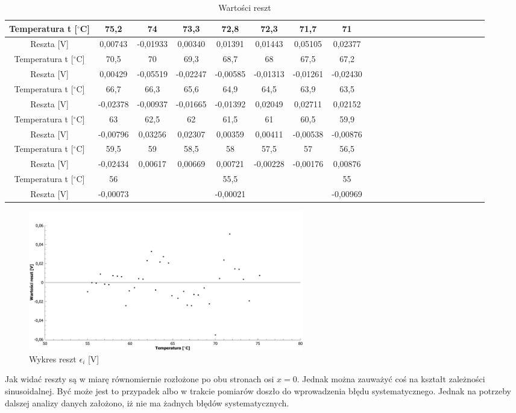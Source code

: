 \documentclass[10pt,a4paper]{article}
\begin{document}
\begin{center}
 \begin{table}[h!]
 \centering
 \caption{Wartości reszt}
 \begin{tabular}{|c|c|c|c|c|c|c|c|c|c|c|c|c|c|c|c|c|c|c|c|c|c|}
\hline
 Temperatura t [$^{\circ}$C]&75,2     & 74       & 73,3     & 72,8     & 72,3     & 71,7     & 71       \\ \hline
Reszta [V]&0,00743  & -0,01933 & 0,00340  & 0,01391  & 0,01443  & 0,05105  & 0,02377  \\ \hline
Temperatura t [$^{\circ}$C]&70,5     & 70       & 69,3     & 68,7     & 68       & 67,5     & 67,2     \\ \hline
Reszta [V]&0,00429  & -0,05519 & -0,02247 & -0,00585 & -0,01313 & -0,01261 & -0,02430 \\ \hline
Temperatura t [$^{\circ}$C]&66,7     & 66,3     & 65,6     & 64,9     & 64,5     & 63,9     & 63,5     \\ \hline
Reszta [V]&-0,02378 & -0,00937 & -0,01665 & -0,01392 & 0,02049  & 0,02711  & 0,02152  \\ \hline
Temperatura t [$^{\circ}$C]&63       & 62,5     & 62       & 61,5     & 61       & 60,5     & 59,9     \\ \hline
Reszta [V]&-0,00796 & 0,03256  & 0,02307  & 0,00359  & 0,00411  & -0,00538 & -0,00876 \\ \hline
Temperatura t [$^{\circ}$C]&59,5     & 59       & 58,5     & 58       & 57,5     & 57       & 56,5     \\ \hline
Reszta [V]&-0,02434 & 0,00617  & 0,00669  & 0,00721  & -0,00228 & -0,00176 & 0,00876  \\ \hline
Temperatura t [$^{\circ}$C]&56       &          &          & 55,5     &          &          & 55       \\ \hline
Reszta [V]&-0,00073 &          &          & -0,00021 &          &          & -0,00969 \\ \hline
\end{tabular}
 \end{table}
 \end{center}

\begin{figure}[h!]
\includegraphics[width=12cm]{rys5.pdf} 
\centering
\caption{Wykres reszt $\epsilon_{i}$ [V]}
\end{figure}
Jak widać reszty są w miarę równomiernie rozłożone po obu stronach osi $x=0$. Jednak można zauważyć coś na kształt zależności sinusoidalnej. Być może jest to przypadek albo w trakcie pomiarów doszło do wprowadzenia błędu systematycznego. Jednak na potrzeby dalszej analizy danych założono, iż nie ma żadnych błędów systematycznych. 
\end{document}
